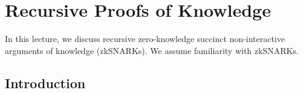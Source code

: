 \newcommand{\niksdef}[6]{
For all expected polynomial-time adversaries 
$\mathcal{P}^*$ 
there exists an expected polynomial-time extractor
$\mathcal{E}$ such that
    \[
    \Pr_{\mathsf{r}}
    \left[
      \begin{array}{l}
        #6
      \end{array}
      \middle\vert
      \begin{array}{l}
        \mathsf{pp} \gets \mathcal{G}(1^{\lambda}, N),\\ 
        (#1, #2, #4) \gets \mathcal{P}^*(\mathsf{pp}, \mathsf{r}),\\
        (\pk, \vk) \gets \En(\pp, #1),\\
        #5,\\
        #3 \gets \mathcal{E}(\pp, \mathsf{r})
      \end{array}
    \right]
    \approx 
    1
    \]
    where $\mathsf{r}$ denotes an arbitrarily long random tape.
}



\newcommand{\R}{\mathcal{R}}

\newcommand{\FP}{F'}
\newcommand{\io}{\mathsf{x}}
\newcommand{\fu}{\mathsf{u}}
\newcommand{\fw}{\mathsf{w}}
\newcommand{\acc}{\mathsf{U}}
\newcommand{\aw}{\mathsf{W}}
\newcommand{\trivi}{\fu_{\bot}}
\newcommand{\trivw}{\fw_{\bot}}
\newcommand{\fold}{\mathsf{NIFS}}
\newcommand{\snark}{\mathsf{SNARK}}
\newcommand{\RIVC}{\R_{\mathsf{IVC}}}
\newcommand{\Str}{\mathsf{s}}
\newcommand{\com}{\mathsf{com}}

\newcommand{\Commit}{\mathsf{Commit}}


\section{Recursive Proofs of Knowledge}

In this lecture, 
we discuss recursive zero-knowledge succinct non-interactive
arguments of knowledge (zkSNARKs).
%
We assume familiarity with zkSNARKs.

\subsection{Introduction}

